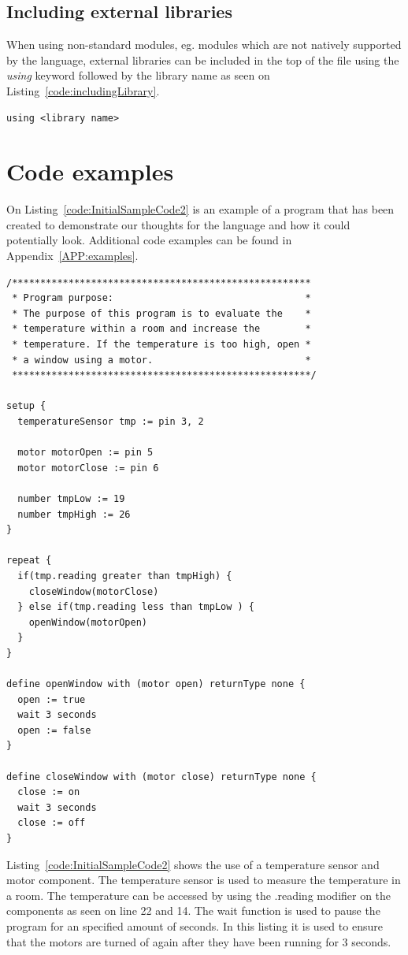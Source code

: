\subsection{Including external libraries}
When using non-standard modules, eg. modules which are not natively supported by the language, external libraries can be included in the top of the file using the \textit{using} keyword followed by the library name as seen on Listing~\ref{code:includingLibrary}.  

\begin{lstlisting}[caption={Example of including an external library},label={code:includingLibrary}]
using <library name>
\end{lstlisting}

\section{Code examples}
On Listing~\ref{code:InitialSampleCode2} is an example of a program that has been created to demonstrate our thoughts for the language and how it could potentially look. 
Additional code examples can be found in Appendix~\ref{APP:examples}.

\begin{lstlisting}[caption={Sample code}, label={code:InitialSampleCode2}]
/*****************************************************
 * Program purpose:                                  *
 * The purpose of this program is to evaluate the    *
 * temperature within a room and increase the        *
 * temperature. If the temperature is too high, open *
 * a window using a motor.                           *
 *****************************************************/

setup {
  temperatureSensor tmp := pin 3, 2
  
  motor motorOpen := pin 5
  motor motorClose := pin 6
  
  number tmpLow := 19
  number tmpHigh := 26
}

repeat {
  if(tmp.reading greater than tmpHigh) {
    closeWindow(motorClose)
  } else if(tmp.reading less than tmpLow ) {
    openWindow(motorOpen)
  }
}

define openWindow with (motor open) returnType none {
  open := true
  wait 3 seconds
  open := false
}

define closeWindow with (motor close) returnType none {
  close := on
  wait 3 seconds
  close := off
}
\end{lstlisting}
Listing~\ref{code:InitialSampleCode2} shows the use of a temperature sensor and motor component. 
The temperature sensor is used to measure the temperature in a room. 
The temperature can be accessed by using the .reading modifier on the components as seen on line 22 and 14. 
The wait function is used to pause the program for an specified amount of seconds. 
In this listing it is used to ensure that the motors are turned of again after they have been running for 3 seconds. 

